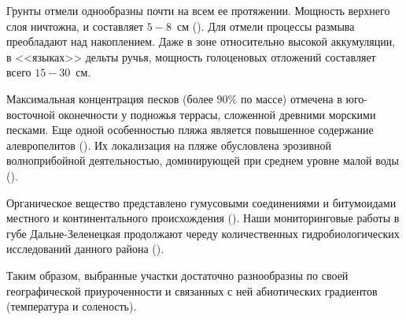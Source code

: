 Грунты отмели однообразны почти на всем ее протяжении. 
Мощность верхнего слоя ничтожна, и составляет $5 - 8$~см (\cite{Prigorovskiy_1948}). 
Для отмели процессы размыва преобладают над накоплением. 
Даже в зоне относительно высокой аккумуляции, в <<языках>> дельты ручья, мощность голоценовых отложений составляет всего $15 - 30$~см.

Максимальная концентрация песков (более $90$\% по массе) отмечена в юго-восточной оконечности у подножья террасы, сложенной древними морскими песками. Еще одной особенностью пляжа является повышенное содержание алевропелитов (\cite{Pavlova_1976}). 
Их локализация на пляже обусловлена эрозивной волноприбойной деятельностью, доминирующей при среднем уровне малой воды (\cite{Alexeev_1976}).

Органическое вещество представлено гумусовыми соединениями и битумоидами местного и континентального происхождения (\cite{Gurevich_Yakovleva_1976}).
Наши мониторинговые работы в губе Дальне-Зеленецкая продолжают череду количественных гидробиологических исследований данного района (\cite{Prigorovskiy_1948, Matveeva_et_al_1955, Streltsov_et_al_1974, Agarova_et_al_1976, Zhukov_1984, Strelkov_et_al_2001}).


Таким образом, выбранные участки достаточно разнообразны по своей географической приуроченности и связанных с ней абиотических градиентов (температура и соленость).

